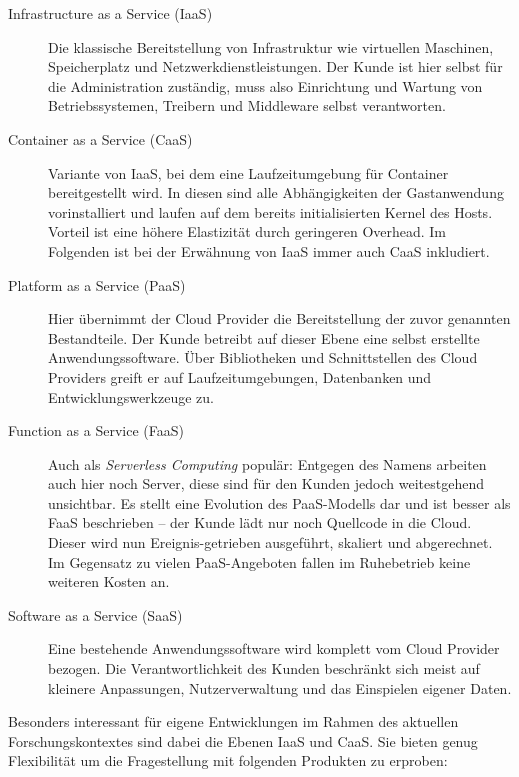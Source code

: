 \begin{description}
	
	\item[Infrastructure as a Service (IaaS)] Die klassische Bereitstellung von Infrastruktur wie virtuellen Maschinen, Speicherplatz und Netzwerkdienstleistungen. Der Kunde ist hier selbst für die Administration zuständig, muss also Einrichtung und Wartung von Betriebssystemen, Treibern und Middleware selbst verantworten.
	
	\item[Container as a Service (CaaS)] Variante von IaaS, bei dem eine Laufzeitumgebung für Container bereitgestellt wird. In diesen sind alle Abhängigkeiten der Gastanwendung vorinstalliert und laufen auf dem bereits initialisierten Kernel des Hosts. Vorteil ist eine höhere Elastizität durch geringeren Overhead. Im Folgenden ist bei der Erwähnung von IaaS immer auch CaaS inkludiert.
	
	\item[Platform as a Service (PaaS)] Hier übernimmt der Cloud Provider die Bereitstellung der zuvor genannten Bestandteile. Der Kunde betreibt auf dieser Ebene eine selbst erstellte Anwendungssoftware. Über Bibliotheken und Schnittstellen des Cloud Providers greift er auf Laufzeitumgebungen, Datenbanken und Entwicklungswerkzeuge zu.
	
	\item[Function as a Service (FaaS)] Auch als \emph{Serverless Computing} populär: Entgegen des Namens arbeiten auch hier noch Server, diese sind für den Kunden jedoch weitestgehend unsichtbar. Es stellt eine Evolution des PaaS-Modells dar und ist besser als FaaS beschrieben -- der Kunde lädt nur noch Quellcode in die Cloud. Dieser wird nun Ereignis-getrieben ausgeführt, skaliert und abgerechnet. Im Gegensatz zu vielen PaaS-Angeboten fallen im Ruhebetrieb keine weiteren Kosten an.
	
	\item[Software as a Service (SaaS)] Eine bestehende Anwendungssoftware wird komplett vom Cloud Provider bezogen. Die Verantwortlichkeit des Kunden beschränkt sich meist auf kleinere Anpassungen, Nutzerverwaltung und das Einspielen eigener Daten.
	
\end{description}

\noindent
Besonders interessant für eigene Entwicklungen im Rahmen des aktuellen Forschungskontextes sind dabei die Ebenen IaaS und CaaS. Sie bieten genug Flexibilität um die Fragestellung mit folgenden Produkten zu erproben:

